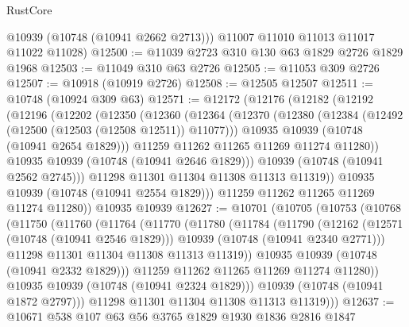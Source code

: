 \begin{lexlean}{RustCore}
\begin{coremodule}
        @10939
        (@10748 (@10941 @2662 @2713)))
      @11007
      @11010
      @11013
      @11017
      @11022
      @11028)
@12500 := @11039 @2723 @310 @130 @63 @1829 @2726 @1829 @1968
@12503 := @11049 @310 @63 @2726
@12505 := @11053 @309 @2726
@12507 := @10918 (@10919 @2726)
@12508 := @12505 @12507
@12511 := @10748 (@10924 @309 @63)
@12571 := @12172
    (@12176
      (@12182
        (@12192
          (@12196
            (@12202
              (@12350
                (@12360
                  (@12364
                    (@12370
                      (@12380
                        (@12384 (@12492 (@12500 (@12503 (@12508 @12511)) @11077)))
                        @10935
                        @10939
                        (@10748 (@10941 @2654 @1829)))
                      @11259
                      @11262
                      @11265
                      @11269
                      @11274
                      @11280))
                  @10935
                  @10939
                  (@10748 (@10941 @2646 @1829)))
                @10939
                (@10748 (@10941 @2562 @2745)))
              @11298
              @11301
              @11304
              @11308
              @11313
              @11319))
          @10935
          @10939
          (@10748 (@10941 @2554 @1829)))
        @11259
        @11262
        @11265
        @11269
        @11274
        @11280))
    @10935
    @10939
@12627 := @10701
    (@10705
      (@10753
        (@10768
          (@11750
            (@11760
              (@11764
                (@11770
                  (@11780
                    (@11784
                      (@11790
                        (@12162
                          (@12571 (@10748 (@10941 @2546 @1829)))
                          @10939
                          (@10748 (@10941 @2340 @2771)))
                        @11298
                        @11301
                        @11304
                        @11308
                        @11313
                        @11319))
                    @10935
                    @10939
                    (@10748 (@10941 @2332 @1829)))
                  @11259
                  @11262
                  @11265
                  @11269
                  @11274
                  @11280))
              @10935
              @10939
              (@10748 (@10941 @2324 @1829)))
            @10939
            (@10748 (@10941 @1872 @2797)))
          @11298
          @11301
          @11304
          @11308
          @11313
          @11319)))
@12637 := @10671 @538 @107 @63 @56 @3765 @1829 @1930 @1836 @2816 @1847

\end{coremodule}
\end{lexlean}
